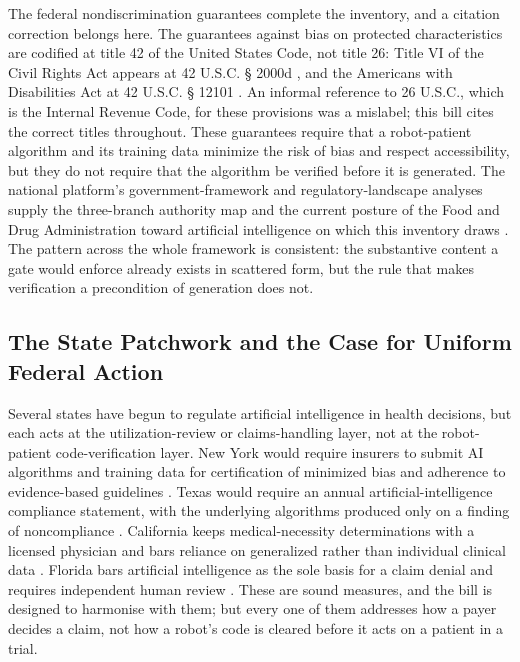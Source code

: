 The federal nondiscrimination guarantees complete the inventory, and a citation
correction belongs here. The guarantees against bias on protected
characteristics are codified at title 42 of the United States Code, not title 26:
Title VI of the Civil Rights Act appears at 42 U.S.C. § 2000d
\cite{usc-titlevi}, and the Americans with Disabilities Act at 42 U.S.C. § 12101
\cite{usc-ada}. An informal reference to 26 U.S.C., which is the Internal Revenue
Code, for these provisions was a mislabel; this bill cites the correct titles
throughout. These guarantees require that a robot-patient algorithm and its
training data minimize the risk of bias and respect accessibility, but they do
not require that the algorithm be verified before it is generated. The national
platform's government-framework and regulatory-landscape analyses supply the
three-branch authority map and the current posture of the Food and Drug
Administration toward artificial intelligence on which this inventory draws
\cite{kawchak2026national}. The pattern across the whole framework is consistent:
the substantive content a gate would enforce already exists in scattered form,
but the rule that makes verification a precondition of generation does not.

\subsection{The State Patchwork and the Case for Uniform Federal Action}

Several states have begun to regulate artificial intelligence in health
decisions, but each acts at the utilization-review or claims-handling layer, not
at the robot-patient code-verification layer. New York would require insurers to
submit AI algorithms and training data for certification of minimized bias and
adherence to evidence-based guidelines \cite{ny-a9149}. Texas would require an
annual artificial-intelligence compliance statement, with the underlying
algorithms produced only on a finding of noncompliance \cite{tx-sb1822}.
California keeps medical-necessity determinations with a licensed physician and
bars reliance on generalized rather than individual clinical data
\cite{ca-sb1120}. Florida bars artificial intelligence as the sole basis for a
claim denial and requires independent human review \cite{fl-hb527}. These are
sound measures, and the bill is designed to harmonise with them; but every one
of them addresses how a payer decides a claim, not how a robot's code is cleared
before it acts on a patient in a trial.

